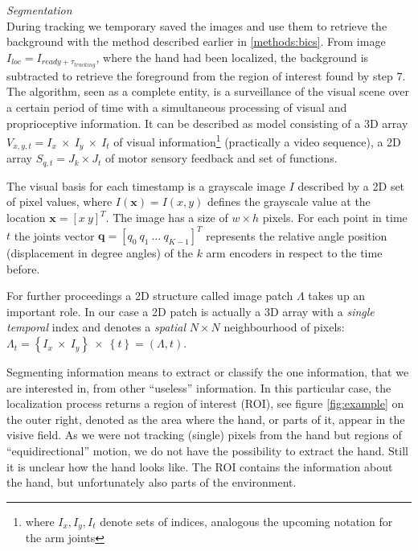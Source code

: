 \textit{Segmentation}\\ \newline 
During tracking we temporary saved the images and use them to retrieve the background with the method described earlier in \ref{methods:bics}. From image $I_{loc}=I_{ready + \tau_{tracking}}$, where the hand had been localized, the background  is subtracted to retrieve the foreground from the region of interest found by step 7.
%
The algorithm, seen as a complete entity, is a surveillance of the visual scene over a certain period of time with a simultaneous processing of visual and proprioceptive information. It can be described as model consisting of a 3D array $V_{x,y,t}=I_x\ \times\ I_y\ \times\ I_t$ of visual information\footnote{where $I_x,I_y,I_t$ denote sets of indices, analogous the upcoming notation for the arm joints} (practically a video sequence), a 2D array $S_{q,t} = J_k \times J_t$ of motor sensory feedback and set of functions. 

The visual basis for each timestamp is a grayscale image $I$ described by a 2D set of pixel values, where $I(\mathbf{x})=I(x,y)$ defines the grayscale value at the location $\mathbf{x}=\left[x\ y\right]^T$. The image has a size of $w \times h$ pixels. 
For each point in time $t$ the joints vector $\mathbf{q} = \left[ q_{0}\ q_1\ \ldots\ q_{K-1} \right]^T$ represents the relative angle position (displacement in degree angles) of the $k$ arm encoders in respect to the time before. %

For further proceedings a 2D structure called image patch $\Lambda$ takes up an important role. In our case a 2D patch is actually a 3D array with a \textit{single temporal} index and denotes a \textit{spatial} $N \times N$ neighbour\-hood of pixels: $\Lambda_t = \left\{I_x\ \times\ I_y\right\}\ \times\ \left\{t\right\} = \left(\Lambda, t\right)$.

Segmenting information means to extract or classify the one information, that we are interested in, from other ``useless'' information. In this particular case, the localization process returns a region of interest (ROI), see figure \ref{fig:example} on the outer right, denoted as the area where the hand, or parts of it, appear in the visive field. As we were not tracking (single) pixels from the hand but regions of ``equidirectional'' motion, we do not have the possibility to extract the hand. Still it is unclear how the hand looks like. The ROI contains the information about the hand, but unfortunately also parts of the environment.

